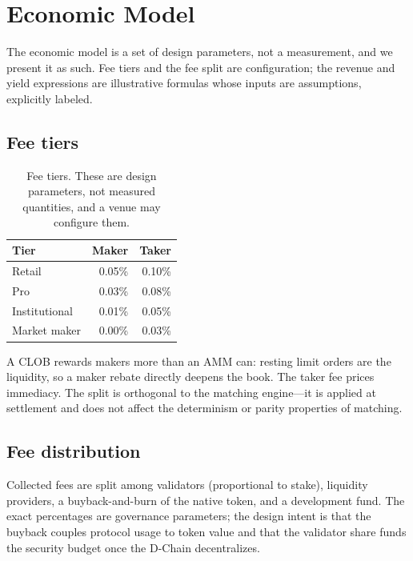 \section{Economic Model}
\label{sec:economic}

The economic model is a set of design parameters, not a measurement, and we present it as
such. Fee tiers and the fee split are configuration; the revenue and yield expressions are
illustrative formulas whose inputs are assumptions, explicitly labeled.

\subsection{Fee tiers}

\begin{table}[H]
\centering
\renewcommand{\arraystretch}{1.2}
\begin{tabular}{l r r}
\toprule
\textbf{Tier} & \textbf{Maker} & \textbf{Taker} \\
\midrule
Retail        & 0.05\% & 0.10\% \\
Pro           & 0.03\% & 0.08\% \\
Institutional & 0.01\% & 0.05\% \\
Market maker  & 0.00\% & 0.03\% \\
\bottomrule
\end{tabular}
\caption{Fee tiers. These are design parameters, not measured quantities, and a venue may
configure them.}
\label{tab:fees}
\end{table}

A CLOB rewards makers more than an AMM can: resting limit orders are the liquidity, so a
maker rebate directly deepens the book. The taker fee prices immediacy. The split is
orthogonal to the matching engine---it is applied at settlement and does not affect the
determinism or parity properties of matching.

\subsection{Fee distribution}

Collected fees are split among validators (proportional to stake), liquidity providers, a
buyback-and-burn of the native token, and a development fund. The exact percentages are
governance parameters; the design intent is that the buyback couples protocol usage to token
value and that the validator share funds the security budget once the D-Chain decentralizes.

